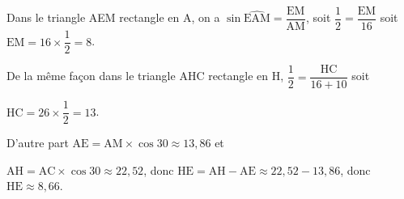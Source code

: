 \medskip
%
%
%
%
%
%
%
%


%
Dans le triangle AEM rectangle en A, on a $\sin \widehat{\text{EAM}} = \dfrac{\text{EM}}{\text{AM}}$, soit $\dfrac{1}{2} = \dfrac{\text{EM}}{16}$ soit $\text{EM} = 16 \times \dfrac{1}{2} = 8$.

De la même façon dans le triangle AHC rectangle en H, $\dfrac{1}{2} = \dfrac{\text{HC}}{16+10}$ soit 

$\text{HC} = 26 \times \dfrac{1}{2} = 13$.

D'autre part $\text{AE} = \text{AM} \times\cos 30 \approx 13,86$ et 

$\text{AH} = \text{AC} \times\cos 30 \approx 22,52$, donc $\text{HE} = \text{AH} - \text{AE} \approx 22,52 - 13,86$, donc  $\text{HE} \approx 8,66$.

\bigskip

